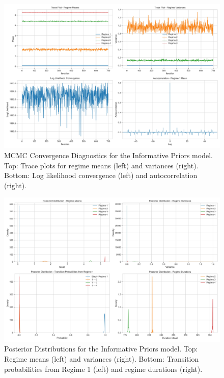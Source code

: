 \begin{figure}[htbp]
    \centering
    \includegraphics[width=\textwidth]{figure3_informative_priors_convergence.jpg}
    \caption{MCMC Convergence Diagnostics for the Informative Priors model. Top: Trace plots for regime means (left) and variances (right). Bottom: Log likelihood convergence (left) and autocorrelation (right).}
    \label{fig:convergence}
\end{figure}

\begin{figure}[htbp]
    \centering
    \includegraphics[width=\textwidth]{figure4_informative_priors_posteriors.jpg}
    \caption{Posterior Distributions for the Informative Priors model. Top: Regime means (left) and variances (right). Bottom: Transition probabilities from Regime 1 (left) and regime durations (right).}
    \label{fig:posteriors}
\end{figure}

